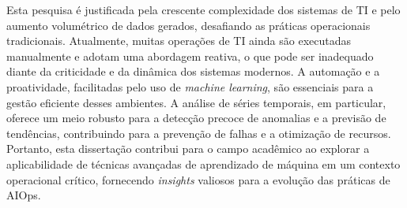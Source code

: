 Esta pesquisa é justificada pela crescente complexidade dos sistemas de TI e pelo aumento volumétrico de dados gerados, desafiando as práticas operacionais tradicionais. Atualmente, muitas operações de TI ainda são executadas manualmente e adotam uma abordagem reativa, o que pode ser inadequado diante da criticidade e da dinâmica dos sistemas modernos. A automação e a proatividade, facilitadas pelo uso de \textit{machine learning}, são essenciais para a gestão eficiente desses ambientes. A análise de séries temporais, em particular, oferece um meio robusto para a detecção precoce de anomalias e a previsão de tendências, contribuindo para a prevenção de falhas e a otimização de recursos. Portanto, esta dissertação contribui para o campo acadêmico ao explorar a aplicabilidade de técnicas avançadas de aprendizado de máquina em um contexto operacional crítico, fornecendo \textit{insights} valiosos para a evolução das práticas de AIOps.